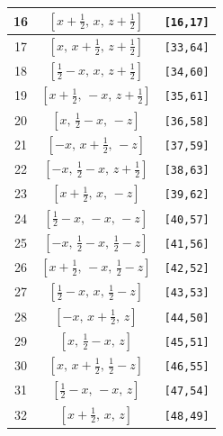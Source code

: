 \documentclass[fleqn,8pt]{jsarticle}
\begin{document}
\begin{longtable}{ccc}
16 & $\left[ x + \frac{1}{2},\, x,\, z + \frac{1}{2} \right]$ & {\tt [16,17]} \\ \hline
17 & $\left[ x,\, x + \frac{1}{2},\, z + \frac{1}{2} \right]$ & {\tt [33,64]} \\ \hline
18 & $\left[ \frac{1}{2} - x,\, x,\, z + \frac{1}{2} \right]$ & {\tt [34,60]} \\ \hline
19 & $\left[ x + \frac{1}{2},\, - x,\, z + \frac{1}{2} \right]$ & {\tt [35,61]} \\ \hline
20 & $\left[ x,\, \frac{1}{2} - x,\, - z \right]$ & {\tt [36,58]} \\ \hline
21 & $\left[ - x,\, x + \frac{1}{2},\, - z \right]$ & {\tt [37,59]} \\ \hline
22 & $\left[ - x,\, \frac{1}{2} - x,\, z + \frac{1}{2} \right]$ & {\tt [38,63]} \\ \hline
23 & $\left[ x + \frac{1}{2},\, x,\, - z \right]$ & {\tt [39,62]} \\ \hline
24 & $\left[ \frac{1}{2} - x,\, - x,\, - z \right]$ & {\tt [40,57]} \\ \hline
25 & $\left[ - x,\, \frac{1}{2} - x,\, \frac{1}{2} - z \right]$ & {\tt [41,56]} \\ \hline
26 & $\left[ x + \frac{1}{2},\, - x,\, \frac{1}{2} - z \right]$ & {\tt [42,52]} \\ \hline
27 & $\left[ \frac{1}{2} - x,\, x,\, \frac{1}{2} - z \right]$ & {\tt [43,53]} \\ \hline
28 & $\left[ - x,\, x + \frac{1}{2},\, z \right]$ & {\tt [44,50]} \\ \hline
29 & $\left[ x,\, \frac{1}{2} - x,\, z \right]$ & {\tt [45,51]} \\ \hline
30 & $\left[ x,\, x + \frac{1}{2},\, \frac{1}{2} - z \right]$ & {\tt [46,55]} \\ \hline
31 & $\left[ \frac{1}{2} - x,\, - x,\, z \right]$ & {\tt [47,54]} \\ \hline
32 & $\left[ x + \frac{1}{2},\, x,\, z \right]$ & {\tt [48,49]} \\
\end{longtable}
\renewcommand{\arraystretch}{1.2}
\end{document}
